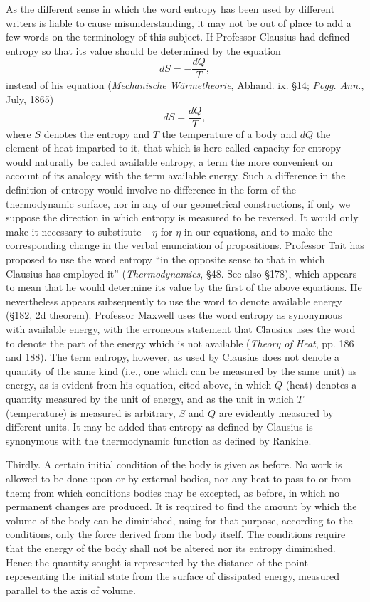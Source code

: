 \documentclass[11pt]{article}
\begin{document}
As the different sense in which the word entropy has been used by different writers is liable to cause misunderstanding, it may not be out of place to add a few words on the terminology of this subject. If Professor Clausius had defined entropy so that its value should be determined by the equation
\[
dS=-\frac{dQ}{T},
\]
instead of his equation (\emph{Mechanische W\"armetheorie}, Abhand. ix. \S 14; \emph{Pogg. Ann.}, July, 1865)
\[
dS=\frac{dQ}{T},
\]
where $S$ denotes the entropy and $T$ the temperature of a body and $dQ$ the element of heat imparted to it, that which is here called capacity for entropy would naturally be called available entropy, a term the more convenient on account of its analogy with the term available energy. Such a difference in the definition of entropy would involve no difference in the form of the thermodynamic surface, nor in any of our geometrical constructions, if only we suppose the direction in which entropy is measured to be reversed. It would only make it necessary to substitute $-\eta$ for $\eta$ in our equations, and to make the corresponding change in the verbal enunciation of propositions. Professor Tait has proposed to use the word entropy ``in the opposite sense to that in which Clausius has employed it'' (\emph{Thermodynamics}, \S 48. See also \S 178), which appears to mean that he would determine its value by the first of the above equations. He nevertheless appears subsequently to use the word to denote available energy (\S 182, 2d theorem). Professor Maxwell uses the word entropy as synonymous with available energy, with the erroneous statement that Clausius uses the word to denote the part of the energy which is not available (\emph{Theory of Heat}, pp. 186 and 188). The term entropy, however, as used by Clausius does not denote a quantity of the same kind (i.e., one which can be measured by the same unit) as energy, as is evident from his equation, cited above, in which $Q$ (heat) denotes a quantity measured by the unit of energy, and as the unit in which $T$ (temperature) is measured is arbitrary, $S$ and $Q$ are evidently measured by different units. It may be added that entropy as defined by Clausius is synonymous with the thermodynamic function as defined by Rankine.

Thirdly. A certain initial condition of the body is given as before. No work is allowed to be done upon or by external bodies, nor any heat to pass to or from them; from which conditions bodies may be excepted, as before, in which no permanent changes are produced. It is required to find the amount by which the volume of the body can be diminished, using for that purpose, according to the conditions, only the force derived from the body itself. The conditions require that the energy of the body shall not be altered nor its entropy diminished. Hence the quantity sought is represented by the distance of the point representing the initial state from the surface of dissipated energy, measured parallel to the axis of volume.
\end{document}
